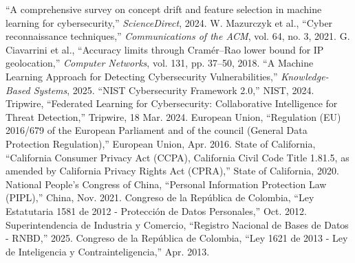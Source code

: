 \begin{thebibliography}{99}
 ``A comprehensive survey on concept drift and feature selection in machine learning for cybersecurity,'' \textit{ScienceDirect}, 2024.
 W. Mazurczyk et al., ``Cyber reconnaissance techniques,'' \textit{Communications of the ACM}, vol. 64, no. 3, 2021.
 G. Ciavarrini et al., ``Accuracy limits through Cram\'er--Rao lower bound for IP geolocation,'' \textit{Computer Networks}, vol. 131, pp. 37--50, 2018.
 ``A Machine Learning Approach for Detecting Cybersecurity Vulnerabilities,'' \textit{Knowledge-Based Systems}, 2025.
 ``NIST Cybersecurity Framework 2.0,'' NIST, 2024.
 Tripwire, ``Federated Learning for Cybersecurity: Collaborative Intelligence for Threat Detection,'' Tripwire, 18 Mar. 2024.
 European Union, ``Regulation (EU) 2016/679 of the European Parliament and of the council (General Data Protection Regulation),'' European Union, Apr. 2016.
 State of California, ``California Consumer Privacy Act (CCPA), California Civil Code Title 1.81.5, as amended by California Privacy Rights Act (CPRA),'' State of California, 2020.
 National People's Congress of China, ``Personal Information Protection Law (PIPL),'' China, Nov. 2021.
 Congreso de la República de Colombia, ``Ley Estatutaria 1581 de 2012 - Protección de Datos Personales,'' Oct. 2012.
 Superintendencia de Industria y Comercio, ``Registro Nacional de Bases de Datos - RNBD,'' 2025.
 Congreso de la República de Colombia, ``Ley 1621 de 2013 - Ley de Inteligencia y Contrainteligencia,'' Apr. 2013.

\end{thebibliography}
